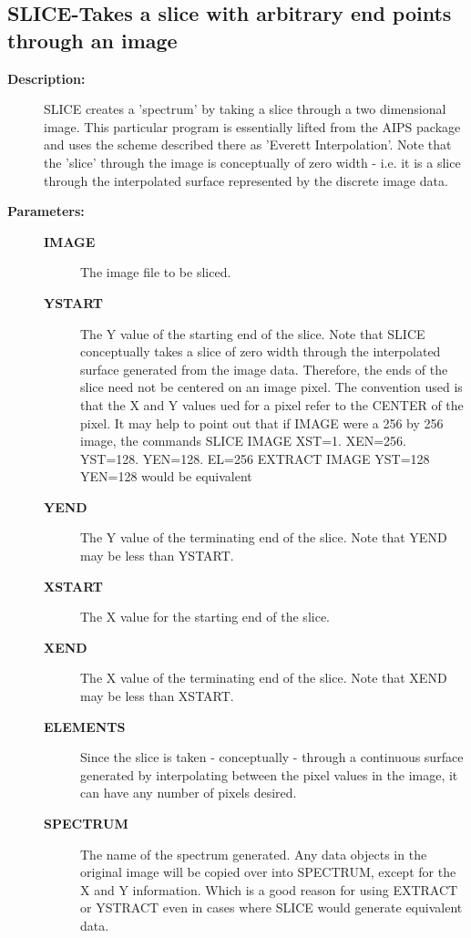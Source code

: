 \subsection{SLICE-\label{SLICE}Takes a slice with arbitrary end points through an image}
\begin{description}

\item [{\bf Description:}]
 SLICE creates a 'spectrum' by taking a slice through a two
 dimensional image.  This particular program is essentially
 lifted from the AIPS package and uses the scheme described
 there as 'Everett Interpolation'.  Note that the 'slice'
 through the image is conceptually of zero width - i.e. it
 is a slice through the interpolated surface represented by
 the discrete image data.

\item [{\bf Parameters:}]
\begin{description}
\item [{\bf IMAGE}]
 The image file to be sliced.
\item [{\bf YSTART}]
 The Y value of the starting end of
 the slice.  Note that SLICE conceptually takes a slice
 of zero width through the interpolated surface generated
 from the image data.  Therefore, the ends of the slice
 need not be centered on an image pixel.  The convention
 used is that the X and Y values ued for a pixel refer to
 the CENTER of the pixel.  It may help to point out that
 if IMAGE were a 256 by 256 image, the commands
 SLICE IMAGE XST=1. XEN=256. YST=128. YEN=128. EL=256
 EXTRACT IMAGE YST=128 YEN=128    would be equivalent
\item [{\bf YEND}]
 The Y value of the terminating end of the slice.
 Note that YEND may be less than YSTART.
\item [{\bf XSTART}]
 The X value for the starting end of the slice.
\item [{\bf XEND}]
 The X value of the terminating end of the slice.
 Note that XEND may be less than XSTART.
\item [{\bf ELEMENTS}]
 Since the slice is taken - conceptually - through a
 continuous surface generated by interpolating between the
 pixel values in the image, it can have any number of pixels
 desired.
\item [{\bf SPECTRUM}]
 The name of the spectrum generated.  Any
 data objects in the original image will be copied over
 into SPECTRUM, except for the X and Y information. Which
 is a good reason for using EXTRACT or YSTRACT even in
 cases where SLICE would generate equivalent data.
\end{description}


\end{description}
